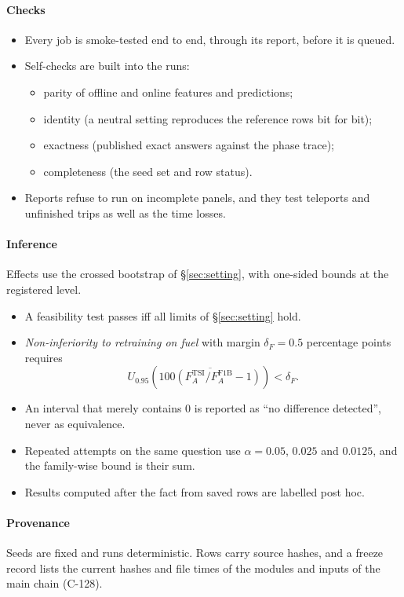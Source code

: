 \paragraph{Checks}
\begin{itemize}\setlength\itemsep{1pt}
\item Every job is smoke-tested end to end, through its report, before it is queued.
\item Self-checks are built into the runs:
\begin{itemize}\setlength\itemsep{0pt}
\item parity of offline and online features and predictions;
\item identity (a neutral setting reproduces the reference rows bit for bit);
\item exactness (published exact answers against the phase trace);
\item completeness (the seed set and row status).
\end{itemize}
\item Reports refuse to run on incomplete panels, and they test teleports and unfinished trips as well as the time losses.
\end{itemize}
\paragraph{Inference} Effects use the crossed bootstrap of §\ref{sec:setting}, with one-sided bounds at the registered level.
\begin{itemize}\setlength\itemsep{1pt}
\item A feasibility test passes iff all limits of §\ref{sec:setting} hold.
\item \emph{Non-inferiority to retraining on fuel} with margin $\delta_F=0.5$ percentage points requires
\begin{equation}
U_{0.95}\!\left(\overline{100(F_A^{\mathrm{TSI}}/F_A^{\mathrm{F1B}}-1)}\right)<\delta_F.
\end{equation}
\item An interval that merely contains 0 is reported as ``no difference detected'', never as equivalence.
\item Repeated attempts on the same question use $\alpha=0.05$, $0.025$ and $0.0125$, and the family-wise bound is their sum.
\item Results computed after the fact from saved rows are labelled post hoc.
\end{itemize}
\paragraph{Provenance} Seeds are fixed and runs deterministic. Rows carry source hashes, and a freeze record lists the current hashes and
file times of the modules and inputs of the main chain (C-128).

